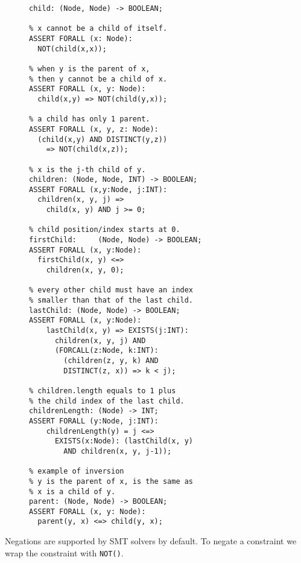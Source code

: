 \begin{figure}[th]
\begin{lstlisting}[caption=SMT functions for defining the children.length DOM operation.  We start with defining the parent-child relationships; then move on to the ordering of children; then use the child index of the last child to define and quantify the {\tt childrenLength()} boolean function,label=childrenLength.]  
% child(x, y): x is a child of y.
child: (Node, Node) -> BOOLEAN;	

% x cannot be a child of itself.
ASSERT FORALL (x: Node):	
  NOT(child(x,x));
	
% when y is the parent of x,
% then y cannot be a child of x.  
ASSERT FORALL (x, y: Node):
  child(x,y) => NOT(child(y,x));
  
% a child has only 1 parent.
ASSERT FORALL (x, y, z: Node):
  (child(x,y) AND DISTINCT(y,z)) 
    => NOT(child(x,z));

% x is the j-th child of y.
children: (Node, Node, INT) -> BOOLEAN;
ASSERT FORALL (x,y:Node, j:INT): 
  children(x, y, j) => 
    child(x, y) AND j >= 0;

% child position/index starts at 0.
firstChild:		(Node, Node) -> BOOLEAN;
ASSERT FORALL (x, y:Node):
  firstChild(x, y) <=> 
    children(x, y, 0);

% every other child must have an index 
% smaller than that of the last child.
lastChild: (Node, Node) -> BOOLEAN;	
ASSERT FORALL (x, y:Node): 	
	lastChild(x, y) => EXISTS(j:INT): 
	  children(x, y, j) AND 
	  (FORCALL(z:Node, k:INT): 
	    (children(z, y, k) AND 
	    DISTINCT(z, x)) => k < j);

% children.length equals to 1 plus
% the child index of the last child.
childrenLength:	(Node) -> INT;
ASSERT FORALL (y:Node, j:INT):
	childrenLength(y) = j <=> 
	  EXISTS(x:Node): (lastChild(x, y) 
	    AND children(x, y, j-1));

% example of inversion
% y is the parent of x, is the same as 
% x is a child of y.
parent: (Node, Node) -> BOOLEAN; 
ASSERT FORALL (x, y: Node): 
  parent(y, x) <=> child(y, x); 
\end{lstlisting} 
\end{figure}

Negations are supported by SMT solvers by default.  To negate a constraint we wrap the constraint with {\tt NOT()}.

